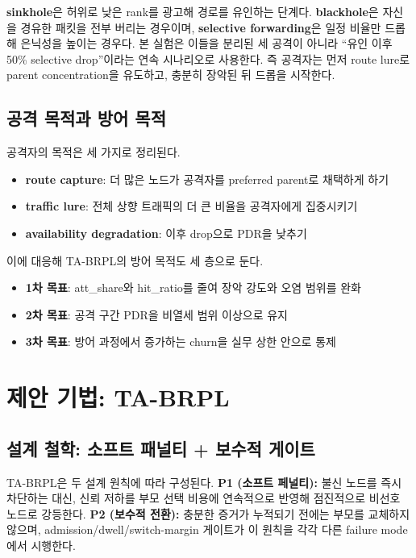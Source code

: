 \documentclass[10pt,a4paper,twocolumn]{article}
\begin{document}
\textbf{sinkhole}은 허위로 낮은 rank를 광고해 경로를 유인하는 단계다.
\textbf{blackhole}은 자신을 경유한 패킷을 전부 버리는 경우이며,
\textbf{selective forwarding}은 일정 비율만 드롭해
은닉성을 높이는 경우다.
본 실험은 이들을 분리된 세 공격이 아니라
``유인 이후 50\% selective drop''이라는 연속 시나리오로 사용한다.
즉 공격자는 먼저 route lure로 parent concentration을 유도하고,
충분히 장악된 뒤 드롭을 시작한다.

\subsection{공격 목적과 방어 목적}

공격자의 목적은 세 가지로 정리된다.
\begin{itemize}
\item \textbf{route capture}: 더 많은 노드가 공격자를 preferred parent로 채택하게 하기
\item \textbf{traffic lure}: 전체 상향 트래픽의 더 큰 비율을 공격자에게 집중시키기
\item \textbf{availability degradation}: 이후 drop으로 PDR을 낮추기
\end{itemize}

이에 대응해 TA-BRPL의 방어 목적도 세 층으로 둔다.
\begin{itemize}
\item \textbf{1차 목표}: att\_share와 hit\_ratio를 줄여 장악 강도와 오염 범위를 완화
\item \textbf{2차 목표}: 공격 구간 PDR을 비열세 범위 이상으로 유지
\item \textbf{3차 목표}: 방어 과정에서 증가하는 churn을 실무 상한 안으로 통제
\end{itemize}


\section{제안 기법: TA-BRPL}
\label{sec:design}

\subsection{설계 철학: 소프트 패널티 + 보수적 게이트}

TA-BRPL은 두 설계 원칙에 따라 구성된다.
\textbf{P1 (소프트 페널티):} 불신 노드를 즉시 차단하는 대신,
신뢰 저하를 부모 선택 비용에 연속적으로 반영해 점진적으로 비선호 노드로 강등한다.
\textbf{P2 (보수적 전환):} 충분한 증거가 누적되기 전에는 부모를 교체하지 않으며,
admission/dwell/switch-margin 게이트가 이 원칙을 각각 다른 failure mode에서 시행한다.
\end{document}
